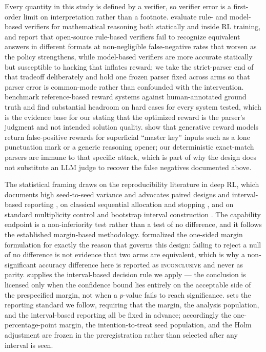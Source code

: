 \documentclass[11pt]{article}
\begin{document}
Every quantity in this study is defined by a verifier, so verifier error is a first-order limit on interpretation rather than a footnote. \citet{huang2025verifierrobustness} evaluate rule- and model-based verifiers for mathematical reasoning both statically and inside RL training, and report that open-source rule-based verifiers fail to recognize equivalent answers in different formats at non-negligible false-negative rates that worsen as the policy strengthens, while model-based verifiers are more accurate statically but susceptible to hacking that inflates reward; we take the strict-parser end of that tradeoff deliberately and hold one frozen parser fixed across arms so that parser error is common-mode rather than confounded with the intervention. \citet{yan2025verifybench} benchmark reference-based reward systems against human-annotated ground truth and find substantial headroom on hard cases for every system tested, which is the evidence base for our stating that the optimized reward is the parser's judgment and not intended solution quality. \citet{zhao2025onetoken} show that generative reward models return false-positive rewards for superficial ``master key'' inputs such as a lone punctuation mark or a generic reasoning opener; our deterministic exact-match parsers are immune to that specific attack, which is part of why the design does not substitute an LLM judge to recover the false negatives documented above.

The statistical framing draws on the reproducibility literature in deep RL, which documents high seed-to-seed variance and advocates paired designs and interval-based reporting \citep{henderson2018deep, agarwal2021deep}, on classical sequential allocation and stopping \citep{lai1985asymptotically, auer2002finite, evendar2006action}, and on standard multiplicity control \citep{holm1979simple} and bootstrap interval construction \citep{efron1993bootstrap}. The capability endpoint is a non-inferiority test rather than a test of no difference, and it follows the established margin-based methodology. \citet{blackwelder1982proving} formalized the one-sided margin formulation for exactly the reason that governs this design: failing to reject a null of no difference is not evidence that two arms are equivalent, which is why a non-significant accuracy difference here is reported as \textsc{inconclusive} and never as parity. \citet{schuirmann1987tost} supplies the interval-based decision rule we apply --- the conclusion is licensed only when the confidence bound lies entirely on the acceptable side of the prespecified margin, not when a $p$-value fails to reach significance. \citet{piaggio2012consort} sets the reporting standard we follow, requiring that the margin, the analysis population, and the interval-based reporting all be fixed in advance; accordingly the one-percentage-point margin, the intention-to-treat seed population, and the Holm adjustment are frozen in the preregistration rather than selected after any interval is seen.
\end{document}

